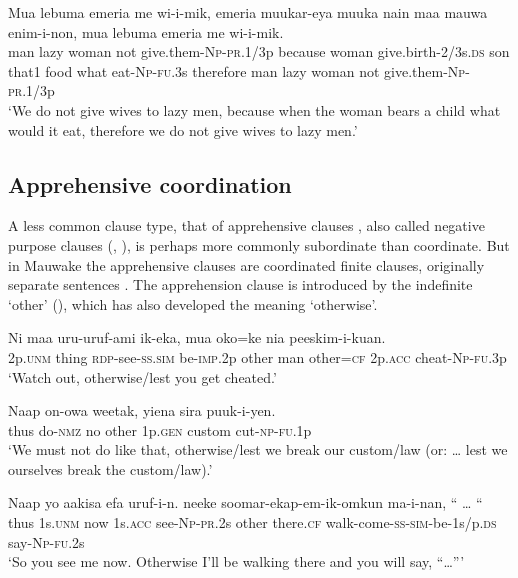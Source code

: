 \ea%
\label{ex:8:x1423}
\gll Mua  lebuma  emeria  me  wi-i-mik,    emeria  muukar-eya  muuka  nain  maa  mauwa  enim-i-non,   mua  lebuma  emeria  me  wi-i-mik.\\
man  lazy  woman  not  give.them-\textsc{Np}-\textsc{pr}.1/3p because  woman give.birth-2/3s.\textsc{ds} son  that1  food  what  eat-\textsc{Np}-\textsc{fu}.3s therefore  man  lazy  woman  not  give.them-\textsc{Np}-\textsc{pr}.1/3p\\
\glt`We do not give wives to lazy men, because when the woman bears a child what would it eat, therefore we do not give wives to lazy men.'
\z


\subsection{Apprehensive coordination} \label{sec:8.1.6}

A less common clause type, that of apprehensive clauses \citep[61]{Roberts1987}, also called negative purpose clauses (\citealt[444]{Haiman1980}, \citealt[188]{ThompsonEtAl1985}), is perhaps more commonly subordinate than coordinate. But in Mauwake the apprehensive clauses are coordinated finite clauses, originally separate sentences . The apprehension clause is introduced by the indefinite  `other' (), which has also developed the meaning `otherwise'.  

\ea%
\label{ex:8:x1426}
\gll Ni  maa  uru-uruf-ami  ik-eka,    mua  oko=ke nia  peeskim-i-kuan.\\
2p.\textsc{unm} thing \textsc{rdp}-see-\textsc{ss}.\textsc{sim}  be-\textsc{imp}.2p  other  man  other=\textsc{cf} 2p.\textsc{acc}  cheat-\textsc{Np}-\textsc{fu}.3p\\
\glt`Watch out, otherwise/lest you get cheated.'
\z


\ea%
\label{ex:8:x1427}
\gll Naap  on-owa  weetak,   yiena  sira  puuk-i-yen. \\
thus  do-\textsc{nmz} no other 1p.\textsc{gen} custom  cut-\textsc{np}-\textsc{fu}.1p\\
\glt`We must not do like that, otherwise/lest we break our custom/law (or: {\dots} lest we ourselves break the custom/law).'
\z


\ea%
\label{ex:8:x1428}
\gll Naap  yo  aakisa  efa  uruf-i-n.   neeke soomar-ekap-em-ik-omkun  ma-i-nan,  ``  {\dots } ``\\
thus  1s.\textsc{unm} now 1s.\textsc{acc} see-\textsc{Np}-\textsc{pr}.2s other there.\textsc{cf} walk-come-\textsc{ss}-\textsc{sim}-be-1s/p.\textsc{ds} say-\textsc{Np}-\textsc{fu}.2s\\
\glt`So you see me now. Otherwise I'll be walking there and you will say, ``{\dots}'''
\z
{}



